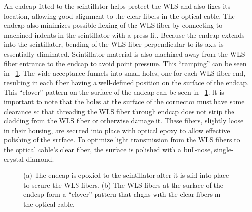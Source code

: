 An endcap fitted to the scintillator helps protect the WLS and also fixes its location, allowing good alignment to the clear fibers in the optical cable.  The endcap also minimizes possible flexing of the WLS fiber by connecting to machined indents in the scintillator with a press fit.  Because the endcap extends into the scintillator, bending of the WLS fiber perpendicular to its axis is essentially eliminated.  Scintillator material is also machined away from the WLS fiber entrance to the endcap to avoid point pressure.  This ``ramping'' can be seen in {\fig}~\ref{fig:paddleAssembly}.  The wide acceptance funnels into small holes, one for each WLS fiber end, resulting in each fiber having a well-defined position on the surface of the endcap.  This ``clover'' pattern on the surface of the endcap can be seen in {\fig}~\ref{fig:paddleAssembly}.  It is important to note that the holes at the surface of the connector must have some clearance so that threading the WLS fiber through endcap does not strip the cladding from the WLS fiber or otherwise damage it.  These fibers, slightly loose in their housing, are secured into place with optical epoxy to allow effective polishing of the surface.  To optimize light transmission from the WLS fibers to the optical cable's clear fiber, the surface is polished with a bull-nose, single-crystal diamond.  
\begin{figure}[!htbp]
\centering
{}
\caption[A view of the endcap used to terminate the WLS fiber.]{(a) The endcap is epoxied to the scintillator after it is slid into place to secure the WLS fibers.  (b) The WLS fibers at the surface of the endcap form a ``clover'' pattern that aligns with the clear fibers in the optical cable.}
\label{fig:paddleAssembly}
\end{figure}

